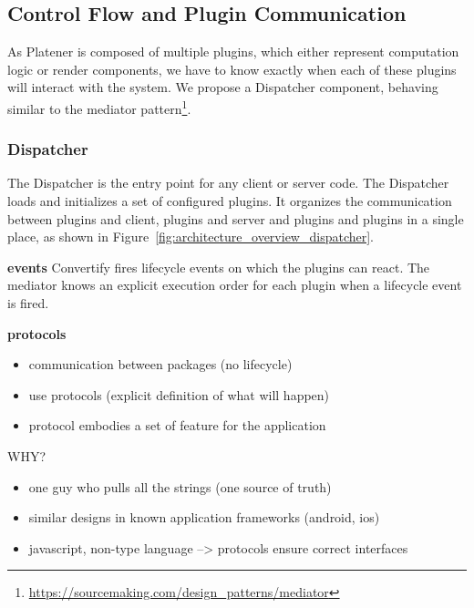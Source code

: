 \documentclass[../ClassicThesis.tex]{subfiles}
\begin{document}
\subsection{Control Flow and Plugin Communication}

As Platener is composed of multiple plugins, which either represent computation
logic or render components, we have to know exactly when each of these plugins
will interact with the system. We propose a Dispatcher component, behaving
similar to the mediator
pattern\footnote{\url{https://sourcemaking.com/design_patterns/mediator}}.

\subsubsection{Dispatcher}

The Dispatcher is the entry point for any client or server code. The Dispatcher
loads and initializes a set of configured plugins. It organizes the
communication between plugins and client, plugins and server and plugins and
plugins in a single place, as shown in Figure~\ref{fig:architecture_overview_dispatcher}.



\textbf{events} Convertify fires lifecycle events on which the plugins can
react. The mediator knows an explicit execution order for each plugin when a
lifecycle event is fired.

\textbf{protocols}
\begin{itemize}
\item communication between packages (no lifecycle)
\item use protocols (explicit definition of what will happen)
\item protocol embodies a set of feature for the application
\end{itemize}

WHY?

\begin{itemize}
\item one guy who pulls all the strings (one source of truth)
\item similar designs in known application frameworks (android, ios)
\item javascript, non-type language --> protocols ensure correct interfaces
\end{itemize}
\end{document}
